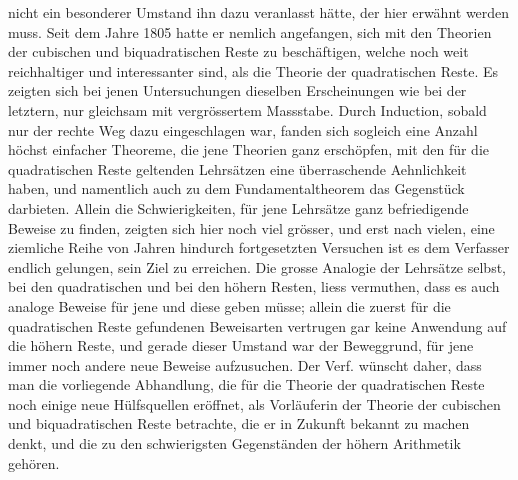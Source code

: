 nicht ein besonderer Umstand ihn dazu veranlasst hätte, der hier erwähnt werden muss. Seit dem Jahre 1805 hatte er nemlich angefangen, sich mit den Theorien der cubischen und biquadratischen Reste zu beschäftigen, welche noch weit reichhaltiger und interessanter sind, als die Theorie der quadratischen Reste. Es zeigten sich bei jenen Untersuchungen dieselben Erscheinungen wie bei der letztern, nur gleichsam mit vergrössertem Massstabe. Durch Induction, sobald nur der rechte Weg dazu eingeschlagen war, fanden sich sogleich eine Anzahl höchst einfacher Theoreme, die jene Theorien ganz erschöpfen, mit den für die quadratischen Reste geltenden Lehrsätzen eine überraschende Aehnlichkeit haben, und namentlich auch zu dem Fundamentaltheorem das Gegenstück darbieten. Allein die Schwierigkeiten, für jene Lehrsätze ganz befriedigende Beweise zu finden, zeigten sich hier noch viel grösser, und erst nach vielen, eine ziemliche Reihe von Jahren hindurch fortgesetzten Versuchen ist es dem Verfasser endlich gelungen, sein Ziel zu erreichen. Die grosse Analogie der Lehrsätze selbst, bei den quadratischen und bei den höhern Resten, liess vermuthen, dass es auch analoge Beweise für jene und diese geben müsse; allein die zuerst für die quadratischen Reste gefundenen Beweisarten vertrugen gar keine Anwendung auf die höhern Reste, und gerade dieser Umstand war der Beweggrund, für jene immer noch andere neue Beweise aufzusuchen. Der Verf. wünscht daher, dass man die vorliegende Abhandlung, die für die Theorie der quadratischen Reste noch einige neue Hülfsquellen eröffnet, als Vorläuferin der Theorie der cubischen und biquadratischen Reste betrachte, die er in Zukunft bekannt zu machen denkt, und die zu den schwierigsten Gegenständen der höhern Arithmetik gehören.

